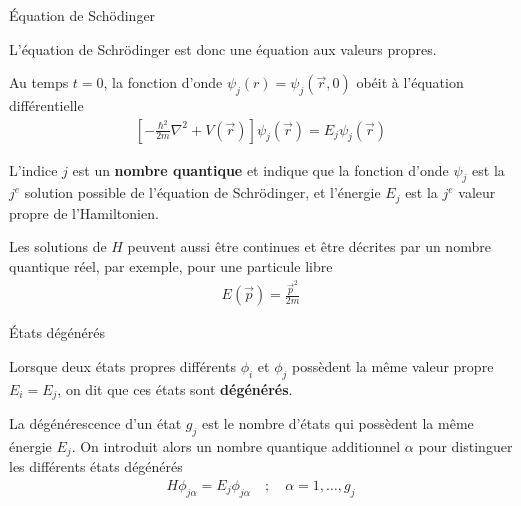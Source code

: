 \documentclass[xcolor=svgnames,t,aspectratio=169,handout]{uqtrcours}
\begin{document}
\begin{frame}{Équation de Schödinger}

L'équation de Schrödinger est donc une équation
  aux valeurs propres.



\medskip

Au temps $t=0$, la fonction d'onde $\psi_j(r) = \psi_j(\vec r, 0)$
  obéit à l'équation différentielle
\begin{align}
    \left[
    -\frac{\hbar^2}{2m} \nabla^2 + V(\vec r) \right] \psi_j(\vec r)
    = E_j \psi_j(\vec r)
\end{align}

L'indice $j$ est un \textbf{nombre quantique}
  et indique que la fonction d'onde $\psi_{j}$
  est la $j^e$ solution possible de l'équation de Schrödinger,
  et l'énergie $E_{j}$ est la $j^e$ valeur propre de l'Hamiltonien.

\medskip
Les solutions de $H$ peuvent aussi être continues
  et être décrites par un nombre quantique réel,
  par exemple, pour une particule libre
\begin{align}
  E(\vec p) = \frac{\vec p^2}{2m}
\end{align}

\end{frame}




\begin{frame}{États dégénérés}


Lorsque deux états propres différents $\phi_i$ et $\phi_j$
  possèdent la même valeur propre $E_i=E_j$,
  on dit que ces états sont \textbf{dégénérés}.

\medskip
La dégénérescence d'un état $g_j$ est le nombre d'états qui possèdent
  la même énergie $E_j$.
On introduit alors un nombre quantique
  additionnel $\alpha$ pour distinguer les différents états dégénérés
\begin{align}
  H \phi_{j\alpha} = E_j \phi_{j\alpha}
  \quad ; \quad \alpha = 1, \dots, g_j
\end{align}


\end{frame}
\end{document}
